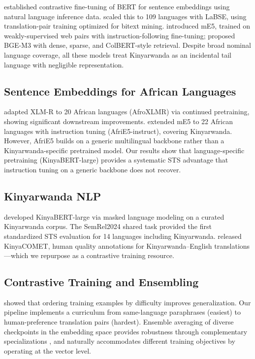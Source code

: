 \documentclass[letterpaper]{article} %
\begin{document}
\citet{reimers-gurevych-2019-sentence} established contrastive fine-tuning
of BERT for sentence embeddings using natural language inference data.
\citet{feng-etal-2022-language} scaled this to 109 languages with LaBSE,
using translation-pair training optimized for bitext mining.
\citet{wang2024multilingual} introduced mE5, trained on weakly-supervised
web pairs with instruction-following fine-tuning; \citet{chen2024bge}
proposed BGE-M3 with dense, sparse, and ColBERT-style retrieval. Despite
broad nominal language coverage, all these models treat Kinyarwanda as an
incidental tail language with negligible representation.

\subsection{Sentence Embeddings for African Languages}

\citet{alabi-etal-2022-adapting} adapted XLM-R to 20 African languages
(AfroXLMR) via continued pretraining, showing significant downstream
improvements. \citet{zhang-etal-2024-afrie5} extended mE5 to 22 African
languages with instruction tuning (AfriE5-instruct), covering Kinyarwanda.
However, AfriE5 builds on a generic multilingual backbone rather than a
Kinyarwanda-specific pretrained model. Our results show that language-specific
pretraining (KinyaBERT-large) provides a systematic STS advantage that
instruction tuning on a generic backbone does not recover.

\subsection{Kinyarwanda NLP}

\citet{nzeyimana-niyongabo-habimana-2022-kinyabert} developed KinyaBERT-large
via masked language modeling on a curated Kinyarwanda corpus. The SemRel2024
shared task \cite{ousidhoum-etal-2024-semrel2024} provided the first
standardized STS evaluation for 14 languages including Kinyarwanda.
\citet{nzeyimana-etal-2023-kinyacomet} released KinyaCOMET, human quality
annotations for Kinyarwanda--English translations---which we repurpose as a
contrastive training resource.

\subsection{Contrastive Training and Ensembling}

\citet{bengio-etal-2009-curriculum} showed that ordering training examples
by difficulty improves generalization. Our pipeline implements a curriculum
from same-language paraphrases (easiest) to human-preference translation
pairs (hardest). Ensemble averaging of diverse checkpoints in the embedding
space provides robustness through complementary specializations
\cite{malinin2021uncertainty}, and naturally accommodates different training
objectives by operating at the vector level.
\end{document}
